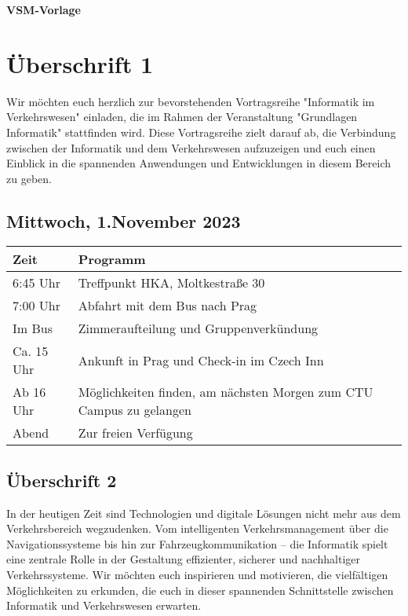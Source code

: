 \documentclass{article}
\begin{document}
\begin{center}
    {\huge \textbf{VSM-Vorlage}}
    \vspace{10pt}
\end{center}


\section*{Überschrift 1}
Wir möchten euch herzlich zur bevorstehenden Vortragsreihe "Informatik im 
Verkehrswesen" einladen, die im Rahmen der Veranstaltung "Grundlagen Informatik" 
stattfinden wird. Diese Vortragsreihe zielt darauf ab, die Verbindung zwischen der 
Informatik und dem Verkehrswesen aufzuzeigen und euch einen Einblick in die spannenden 
Anwendungen und Entwicklungen in diesem Bereich zu geben.

\subsection*{Mittwoch, 1.November 2023}

\begin{table}[h]
    \begin{tabularx}{\textwidth}{l|X}
        Zeit & Programm \\
        \hline
        6:45 Uhr & Treffpunkt HKA, Moltkestraße 30 \\
        7:00 Uhr & Abfahrt mit dem Bus nach Prag \\
        Im Bus & Zimmeraufteilung und Gruppenverkündung \\
        Ca. 15 Uhr & Ankunft in Prag und Check-in im Czech Inn \\
        Ab 16 Uhr & Möglichkeiten finden, am nächsten Morgen zum CTU Campus zu gelangen \\
        Abend & Zur freien Verfügung
    \end{tabularx}
    \end{table}

\subsection*{Überschrift 2}
In der heutigen Zeit sind Technologien und digitale Lösungen nicht mehr aus dem Verkehrsbereich
wegzudenken. Vom intelligenten Verkehrsmanagement über die Navigationssysteme bis hin zur
Fahrzeugkommunikation – die Informatik spielt eine zentrale Rolle in der Gestaltung effizienter, 
sicherer und nachhaltiger Verkehrssysteme. Wir möchten euch inspirieren und motivieren, 
die vielfältigen Möglichkeiten zu erkunden, die euch in dieser spannenden Schnittstelle zwischen 
Informatik und Verkehrswesen erwarten.
\end{document}
